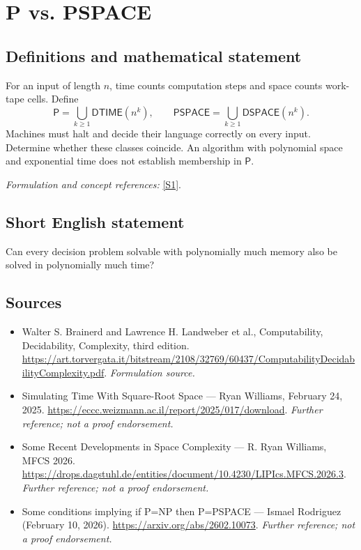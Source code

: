 \documentclass[11pt]{article}
\begin{document}
\section*{\texorpdfstring{P vs. PSPACE}{P vs. PSPACE}}\label{3402}
\subsection{Definitions and mathematical statement}
For an input of length $n$, time counts computation steps and space counts work-tape cells. Define
\[
 \mathsf P=\bigcup_{k\ge1}\mathsf{DTIME}(n^k),\qquad
 \mathsf{PSPACE}=\bigcup_{k\ge1}\mathsf{DSPACE}(n^k).
\]
Machines must halt and decide their language correctly on every input. Determine whether these classes coincide. An algorithm with polynomial space and exponential time does not establish membership in $\mathsf P$.
\par\smallskip\textit{Formulation and concept references:} \href{https://art.torvergata.it/bitstream/2108/32769/60437/ComputabilityDecidabilityComplexity.pdf}{[S1]}.

\subsection{Short English statement}
Can every decision problem solvable with polynomially much memory also be solved in polynomially much time?
\subsection{Sources}
\begin{itemize}
\item[S1]Walter S. Brainerd and Lawrence H. Landweber et al., Computability, Decidability, Complexity, third edition.
\url{https://art.torvergata.it/bitstream/2108/32769/60437/ComputabilityDecidabilityComplexity.pdf}.
\textit{Formulation source.}
\item[S2]Simulating Time With Square-Root Space — Ryan Williams, February 24, 2025.
\url{https://eccc.weizmann.ac.il/report/2025/017/download}.
\textit{Further reference; not a proof endorsement.}
\item[S3]Some Recent Developments in Space Complexity — R. Ryan Williams, MFCS 2026.
\url{https://drops.dagstuhl.de/entities/document/10.4230/LIPIcs.MFCS.2026.3}.
\textit{Further reference; not a proof endorsement.}
\item[S4]Some conditions implying if P=NP then P=PSPACE — Ismael Rodriguez (February 10, 2026).
\url{https://arxiv.org/abs/2602.10073}.
\textit{Further reference; not a proof endorsement.}
\end{itemize}
\end{document}
